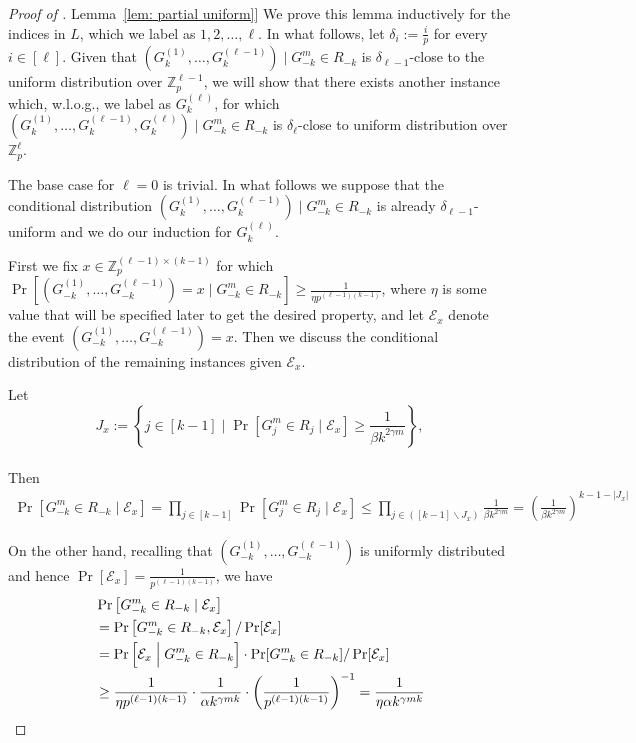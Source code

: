 \documentclass[11pt]{article}
\numberwithin{equation}{section}
\theoremstyle{definition}
\theoremstyle{plain}
\newcommand{\Z}{\mathbb Z}
\newcommand{\expref}[2]{\hyperref[#2]{#1~\ref{#2}}}
\newcommand{\set}[1]{{\left \{{#1} \right \}}}
\newcommand{\cond}{\;|\;}
\newcommand{\Cond}{\;\Big|\;}
\newcommand{\error}{\ensuremath{\delta}}
\newcommand{\eqdef}{\ensuremath{:=}}
\newcommand{\event}{\ensuremath{\mathcal{E}}}
\begin{document}
	\begin{proof}[Proof of \expref{Lemma}{lem: partial uniform}]
		We prove this lemma inductively for the indices in $L$, {\color{black}which we label as $1,2, \dots, \ell$.}
		In what follows, let $\error_{i}\eqdef \frac{i}{p}$ for every $i\in [\ell]$.
		Given that $\left(G_k^{(1)},\dots,G_k^{(\ell-1)}\right)\Cond G_{-k}^m \in R_{-k}$ is $\error_{\ell-1}$-close to the uniform distribution over $\Z_p^{\ell-1}$, we will show that there exists another instance which, w.l.o.g., we label as $G_k^{(\ell)} $, for which 
		$\left(G_k^{(1)},\dots,G_k^{(\ell-1)},G_k^{(\ell)}\right)\Cond G_{-k}^m \in R_{-k}$ is $\error_{\ell}$-close to uniform distribution over $\Z_p^{\ell}$.
		
		The base case for $\ell=0$ is trivial. 
		In what follows we suppose that the conditional distribution $\left(G_k^{(1)},\dots,G_k^{(\ell-1)}\right)\Cond G_{-k}^m \in R_{-k}$ is already $\error_{\ell-1}$-uniform and we do our induction for $G_k^{(\ell)}$.

		First we fix $x\in \Z_p^{(\ell-1)\times (k-1)}$ for which $\Pr\left[\left(G_{-k}^{(1)},\dots,G_{-k}^{(\ell-1)}\right)=x \cond G_{-k}^m\in R_{-k} \right] \ge \frac{1}{\eta  p^{(\ell-1)(k-1)}}$, {\color{black} where $\eta$ is some value that will be specified later to get the desired property,}
		and let $\event_x$ denote  the event 
		$\left(G_{-k}^{(1)},\dots,G_{-k}^{(\ell-1)}\right)=x$.  
		Then we discuss the conditional distribution of the remaining instances given $\event_x$.


		Let
		$$J_x \eqdef \set{j\in [k-1] \; \Big| \; \Pr\left[G^m_j\in R_j\; \big| \; \event_x\right] \ge \frac{1}{\beta k^{2\gamma m}} },$$
		\\
		Then
		\begin{align}\label{ineq:A1_upper}
			\Pr\left[ G^m_{-k}\in R_{-k} \cond \event_x \right] =
		\prod_{j\in [k-1]} 
			\Pr\left[ G_j^m\in R_j \cond  \event_x \right]
			\le 
			\prod_{j\in ([k-1]\backslash J_x)} \frac{1}{\beta k^{2\gamma m}} = \left( \frac{1}{\beta k^{2\gamma m}} \right)^{k-1-|J_x|}
		\end{align}


		On the other hand, recalling that $\left(G_{-k}^{(1)},\dots,G_{-k}^{(\ell-1)}\right)$ is uniformly distributed and hence $\Pr[\event_x]=\frac{1}{p^{(\ell-1)(k-1)}}$, we have
		\begin{align}
			& \Pr\left[ G^m_{-k}\in R_{-k} \cond \event_x \right] \notag \\
			&=\Pr\left[G^m_{-k}\in R_{-k},\event_x\right] / \Pr[\event_x]
			\notag\\
			&= \Pr\left[ \event_x \Cond G_{-k}^m\in R_{-k} \right] \cdot \Pr[G_{-k}^m\in R_{-k}]/\Pr[\event_x] \notag \\
			&\ge  \frac{1}{\eta p^{(\ell-1)(k-1)}} \cdot \frac{1}{\alpha k^{\gamma mk}} \cdot \left(\frac{1}{p^{(\ell-1)(k-1)}}\right)^{-1}
			=\frac{1}{\eta \alpha k^{\gamma mk}}
			\label{ineq:A1_lower}
		\end{align}


\end{proof}
\end{document}
